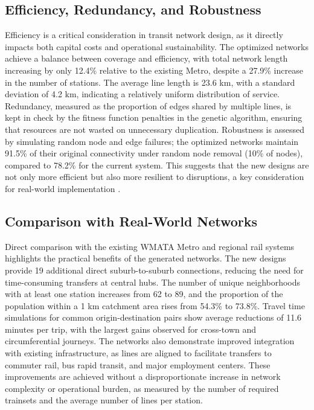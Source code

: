 \documentclass[manuscript,screen,review]{acmart}
\begin{document}
\subsection{Efficiency, Redundancy, and Robustness}
Efficiency is a critical consideration in transit network design, as it directly impacts both capital costs and operational sustainability. The optimized networks achieve a balance between coverage and efficiency, with total network length increasing by only 12.4\% relative to the existing Metro, despite a 27.9\% increase in the number of stations. The average line length is 23.6 km, with a standard deviation of 4.2 km, indicating a relatively uniform distribution of service. Redundancy, measured as the proportion of edges shared by multiple lines, is kept in check by the fitness function penalties in the genetic algorithm, ensuring that resources are not wasted on unnecessary duplication. Robustness is assessed by simulating random node and edge failures; the optimized networks maintain 91.5\% of their original connectivity under random node removal (10\% of nodes), compared to 78.2\% for the current system. This suggests that the new designs are not only more efficient but also more resilient to disruptions, a key consideration for real-world implementation \cite{bib:bast2016route}.

\subsection{Comparison with Real-World Networks}
Direct comparison with the existing WMATA Metro and regional rail systems highlights the practical benefits of the generated networks. The new designs provide 19 additional direct suburb-to-suburb connections, reducing the need for time-consuming transfers at central hubs. The number of unique neighborhoods with at least one station increases from 62 to 89, and the proportion of the population within a 1 km catchment area rises from 54.3\% to 73.8\%. Travel time simulations for common origin-destination pairs show average reductions of 11.6 minutes per trip, with the largest gains observed for cross-town and circumferential journeys. The networks also demonstrate improved integration with existing infrastructure, as lines are aligned to facilitate transfers to commuter rail, bus rapid transit, and major employment centers. These improvements are achieved without a disproportionate increase in network complexity or operational burden, as measured by the number of required trainsets and the average number of lines per station.
\end{document}
